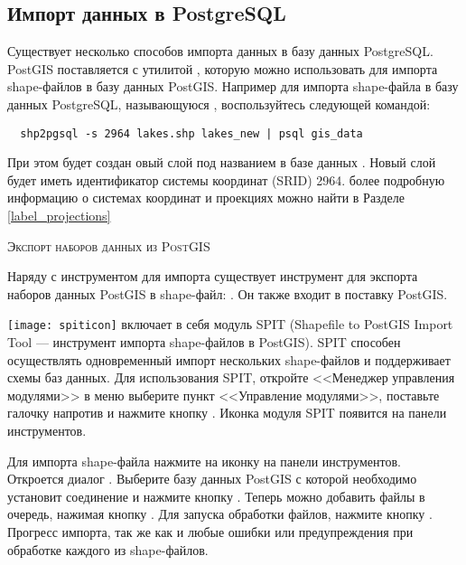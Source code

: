 
\subsection{Импорт данных в PostgreSQL}\label{sec:loading_postgis_data}

Существует несколько способов импорта данных в базу данных PostgreSQL. PostGIS
поставляется с утилитой , которую можно использовать для импорта shape-файлов
в базу данных PostGIS. Например для импорта shape-файла
в базу данных PostgreSQL, называющуюся , воспользуйтесь следующей командой:

\begin{verbatim}
  shp2pgsql -s 2964 lakes.shp lakes_new | psql gis_data
\end{verbatim}

При этом будет создан овый слой под названием  в
базе данных .
Новый слой будет иметь идентификатор системы координат (SRID) 2964. более подробную информацию
о системах координат и проекциях можно найти в Разделе \ref{label_projections}
\begin{Tip}
\caption{\textsc{Экспорт наборов данных из PostGIS}}
Наряду с инструментом для импорта  существует инструмент для экспорта
наборов данных PostGIS в shape-файл: . Он также
входит в поставку PostGIS.
\end{Tip}

\texttt{[image: spiticon]} \qg включает в себя
модуль
SPIT (Shapefile to PostGIS Import Tool --- инструмент импорта shape-файлов в PostGIS).
SPIT способен осуществлять одновременный импорт нескольких shape-файлов и поддерживает схемы баз данных.
Для использования SPIT, откройте <<Менеджер управления модулями>> \qg в меню 
выберите пункт <<Управление модулями>>,
поставьте галочку напротив  и нажмите кнопку . Иконка модуля SPIT
появится на панели инструментов.

Для импорта shape-файла нажмите на иконку 
на панели инструментов. \\
Откроется диалог . Выберите базу данных PostGIS
с которой необходимо установит соединение и нажмите кнопку .  Теперь можно добавить
файлы в очередь, нажимая кнопку . Для запуска обработки файлов,
нажмите кнопку . Прогресс импорта, так же как и любые
ошибки или предупреждения при обработке каждого из shape-файлов.

